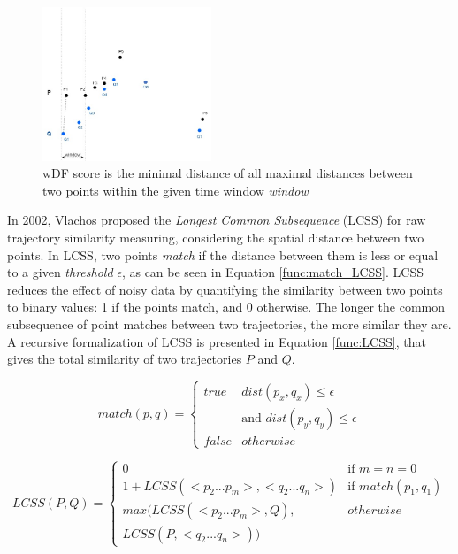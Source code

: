 \begin{figure}[ht]
\centering
\includegraphics[width=0.45\textwidth]{Related_Works/related_trajes-wDF.jpg}
\caption{\label{fig:related_trajes_wDF}wDF score is the minimal distance of all maximal distances between two points within the given time window \textit{window}}
\end{figure}

In 2002, Vlachos \cite{vlachos2002discovering} proposed the \emph{Longest Common Subsequence} (LCSS) for raw trajectory similarity measuring, considering the spatial distance between two points. In LCSS, two points \textit{match} if the distance between them is less or equal to a given \textit{threshold} $\epsilon$, as can be seen in Equation \ref{func:match_LCSS}. LCSS reduces the effect of noisy data by quantifying the similarity between two points to binary values: 1 if the points match, and 0 otherwise. The longer the common subsequence of point matches between two trajectories, the more similar they are. 
A recursive formalization of LCSS is presented in Equation \ref{func:LCSS}{, that gives the total similarity of two trajectories $P$ and $Q$}.

\begin{equation}
\label{func:match_LCSS}
  match(p, q) = 
  \begin{cases} 
      true & dist(p_x, q_x)  \leq \epsilon\\ 
        &            \text{and } dist(p_y, q_y)  \leq \epsilon\\
      false & otherwise
  \end{cases}
\end{equation}

\begin{equation}
\label{func:LCSS}
  LCSS(P, Q) = 
  \begin{cases} 
      0 & \text{if } m = n = 0\\ 
      1 + LCSS(<p_2...p_m>,<q_2...q_n>) & \text{if } match(p_1, q_1)\\
      max(LCSS(<p_2...p_m>, Q),  & otherwise \\
      LCSS(P, <q_2...q_n>))
  \end{cases}
\end{equation}

